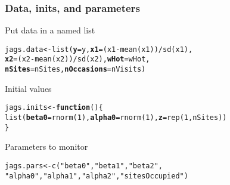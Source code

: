 \documentclass[color=usenames,dvipsnames]{beamer}\usepackage[]{graphicx}\usepackage[]{color}
\makeatletter
\newcommand{\hlnum}[1]{\textcolor[rgb]{0.69,0.494,0}{#1}}%
\newcommand{\hlstr}[1]{\textcolor[rgb]{0.749,0.012,0.012}{#1}}%
\newcommand{\hlopt}[1]{\textcolor[rgb]{0,0,0}{#1}}%
\newcommand{\hlstd}[1]{\textcolor[rgb]{0,0,0}{#1}}%
\newcommand{\hlkwa}[1]{\textcolor[rgb]{0,0,0}{\textbf{#1}}}%
\newcommand{\hlkwb}[1]{\textcolor[rgb]{0,0.341,0.682}{#1}}%
\newcommand{\hlkwc}[1]{\textcolor[rgb]{0,0,0}{\textbf{#1}}}%
\newcommand{\hlkwd}[1]{\textcolor[rgb]{0.004,0.004,0.506}{#1}}%
\newenvironment{kframe}{%
 \def\at@end@of@kframe{}%
 \ifinner\ifhmode%
  \def\at@end@of@kframe{\end{minipage}}%
  \begin{minipage}{\columnwidth}%
 \fi\fi%
 \def\FrameCommand##1{\hskip\@totalleftmargin \hskip-\fboxsep
 \colorbox{shadecolor}{##1}\hskip-\fboxsep
     \hskip-\linewidth \hskip-\@totalleftmargin \hskip\columnwidth}%
 \MakeFramed {\advance\hsize-\width
   \@totalleftmargin\z@ \linewidth\hsize
   \@setminipage}}%
 {\par\unskip\endMakeFramed%
 \at@end@of@kframe}
\newenvironment{knitrout}{}{} %
\makeatother
\begin{document}
\begin{frame}[fragile]
  \frametitle{Data, inits, and parameters}
  Put data in a named list
  \vspace{-12pt}
\begin{knitrout}\small
{}\color{fgcolor}\begin{kframe}
\begin{alltt}
\hlstd{jags.data} \hlkwb{<-} \hlkwd{list}\hlstd{(}\hlkwc{y}\hlstd{=y,} \hlkwc{x1}\hlstd{=(x1}\hlopt{-}\hlkwd{mean}\hlstd{(x1))}\hlopt{/}\hlkwd{sd}\hlstd{(x1),}
                  \hlkwc{x2}\hlstd{=(x2}\hlopt{-}\hlkwd{mean}\hlstd{(x2))}\hlopt{/}\hlkwd{sd}\hlstd{(x2),} \hlkwc{wHot}\hlstd{=wHot,}
                  \hlkwc{nSites}\hlstd{=nSites,} \hlkwc{nOccasions}\hlstd{=nVisits)}
\end{alltt}
\end{kframe}
\end{knitrout}
\pause
\vfill
  Initial values
  \vspace{-12pt}
\begin{knitrout}\small
{}\color{fgcolor}\begin{kframe}
\begin{alltt}
\hlstd{jags.inits} \hlkwb{<-} \hlkwa{function}\hlstd{() \{}
    \hlkwd{list}\hlstd{(}\hlkwc{beta0}\hlstd{=}\hlkwd{rnorm}\hlstd{(}\hlnum{1}\hlstd{),} \hlkwc{alpha0}\hlstd{=}\hlkwd{rnorm}\hlstd{(}\hlnum{1}\hlstd{),} \hlkwc{z}\hlstd{=}\hlkwd{rep}\hlstd{(}\hlnum{1}\hlstd{, nSites))}
\hlstd{\}}
\end{alltt}
\end{kframe}
\end{knitrout}
\pause
\vfill
  Parameters to monitor
  \vspace{-12pt}
\begin{knitrout}\small
{}\color{fgcolor}\begin{kframe}
\begin{alltt}
\hlstd{jags.pars} \hlkwb{<-} \hlkwd{c}\hlstd{(}\hlstr{"beta0"}\hlstd{,} \hlstr{"beta1"}\hlstd{,} \hlstr{"beta2"}\hlstd{,}
               \hlstr{"alpha0"}\hlstd{,} \hlstr{"alpha1"}\hlstd{,} \hlstr{"alpha2"}\hlstd{,} \hlstr{"sitesOccupied"}\hlstd{)}
\end{alltt}
\end{kframe}
\end{knitrout}
\end{frame}
\end{document}
